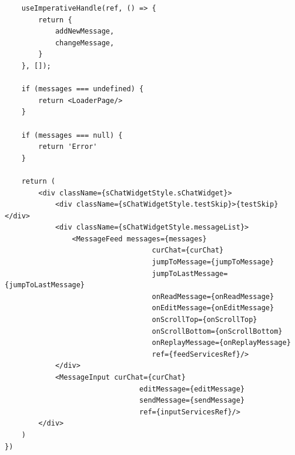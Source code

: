 \begin{lstlisting}
    useImperativeHandle(ref, () => {
        return {
            addNewMessage,
            changeMessage,
        }
    }, []);

    if (messages === undefined) {
        return <LoaderPage/>
    }

    if (messages === null) {
        return 'Error'
    }

    return (
        <div className={sChatWidgetStyle.sChatWidget}>
            <div className={sChatWidgetStyle.testSkip}>{testSkip}</div>
            <div className={sChatWidgetStyle.messageList}>
                <MessageFeed messages={messages}
                                   curChat={curChat}
                                   jumpToMessage={jumpToMessage}
                                   jumpToLastMessage={jumpToLastMessage}
                                   onReadMessage={onReadMessage}
                                   onEditMessage={onEditMessage}
                                   onScrollTop={onScrollTop}
                                   onScrollBottom={onScrollBottom}
                                   onReplayMessage={onReplayMessage}
                                   ref={feedServicesRef}/>
            </div>
            <MessageInput curChat={curChat}
                                editMessage={editMessage}
                                sendMessage={sendMessage}
                                ref={inputServicesRef}/>
        </div>
    )
})

\end{lstlisting}
